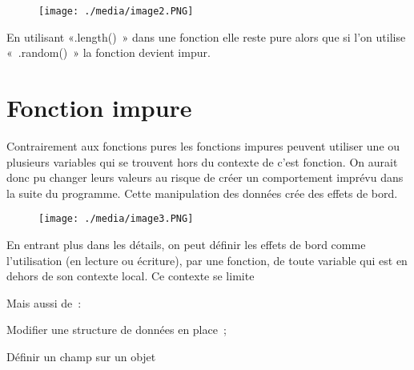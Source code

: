 \documentclass[12pt]{article}
\begin{document}
\begin{figure}[H]
	\begin{Center}
		\texttt{[image: ./media/image2.PNG]}
	\end{Center}
\end{figure}



\par

En utilisant «.length() » dans une fonction elle reste pure alors que si l’on utilise « .random() » la fonction devient impur.\par

\section*{Fonction impure}
Contrairement aux fonctions pures les fonctions impures peuvent utiliser une ou plusieurs variables qui se trouvent hors du contexte de c’est fonction. On aurait donc pu changer leurs valeurs au risque de créer un comportement imprévu dans la suite du programme. Cette manipulation des données crée des effets de bord.\par




\begin{figure}[H]
\advance\leftskip 0.24in		\texttt{[image: ./media/image3.PNG]}
\end{figure}



\par

En entrant plus dans les détails, on peut définir les effets de bord comme l’utilisation (en lecture ou écriture), par une fonction, de toute variable qui est en dehors de son contexte local. Ce contexte se limite\par

Mais aussi de :\par

Modifier une structure de données en place ;\par

Définir un champ sur un objet\par
\end{document}

